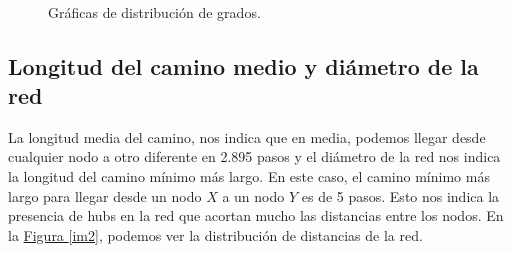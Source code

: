 \documentclass[paper=a4, fontsize=11pt]{article} %
\numberwithin{equation}{section} %
\numberwithin{figure}{section} %
\numberwithin{table}{section} %
\begin{document}
\begin{figure}[H]
    \centering
    \mbox {
    }
    \mbox{
        \qquad
    }
    \caption{Gráficas de distribución de grados.}
    \label{im1}
\end{figure}

\subsection{Longitud del camino medio y diámetro de la red}

La longitud media del camino, nos indica que en media, podemos llegar desde cualquier nodo a otro diferente en 2.895 pasos y el diámetro de la red nos indica la longitud del camino mínimo más largo. En este caso, el camino mínimo más largo para llegar desde un nodo $X$ a un nodo $Y$ es de 5 pasos. Esto nos indica la presencia de hubs en la red que acortan mucho las distancias entre los nodos. En la \hyperref[im2]{Figura \ref*{im2}}, podemos ver la distribución de distancias de la red.
\end{document}
